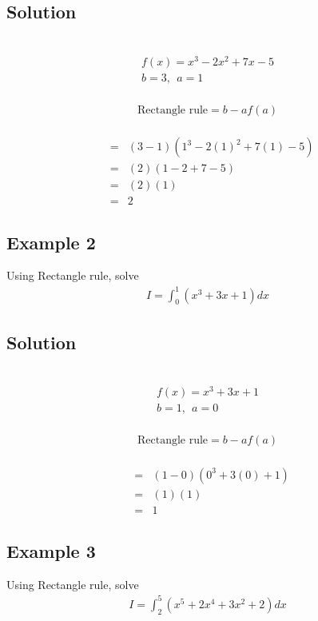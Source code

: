 \documentclass[12pt]{report}
\newcommand{\sps}{\\[0.2cm]}
\begin{document}
	\subsection*{Solution}
	{~}\\[-2.1cm]
	\begin{eqnarray*}
		f(x) = x^3 - 2x^2 + 7x - 5\sps
		b = 3,~~ a = 1
	\end{eqnarray*}
	{~}\\[-2.1cm]
	\begin{gather*}
		\text{Rectangle rule} = b-af(a)
	\end{gather*}
	{~}\\[-2.1cm]
	\begin{eqnarray*}
		&=&(3-1)(1^3 - 2(1)^2 + 7(1) - 5)\sps
		&=&(2)(1-2+7-5)\sps
		&=&(2)(1)\sps
		&=&2
	\end{eqnarray*}
	
	\subsection{Example 2}
	Using Rectangle rule, solve
	\begin{eqnarray*}
		I = \int_0^1\left(x^3 + 3x + 1\right)dx
	\end{eqnarray*}

	\subsection*{Solution}
	{~}\\[-2.1cm]
	\begin{gather*}
		f(x) = x^3 + 3x + 1\sps
		b=1,~~ a = 0
	\end{gather*}
	{~}\\[-2.1cm]
	\begin{gather*}
		\text{Rectangle rule} = b-af(a)
	\end{gather*}
	{~}\\[-2.1cm]
	\begin{eqnarray*}
		&=&(1-0)(0^3 + 3(0) + 1)\sps
		&=&(1)(1)\sps
		&=&1
	\end{eqnarray*}
	
	\subsection{Example 3}
	Using Rectangle rule, solve
	\begin{eqnarray*}
		I = \int_2^5\left(x^5 + 2x^4 + 3x^2 + 2\right)dx
	\end{eqnarray*}
	
\end{document}
